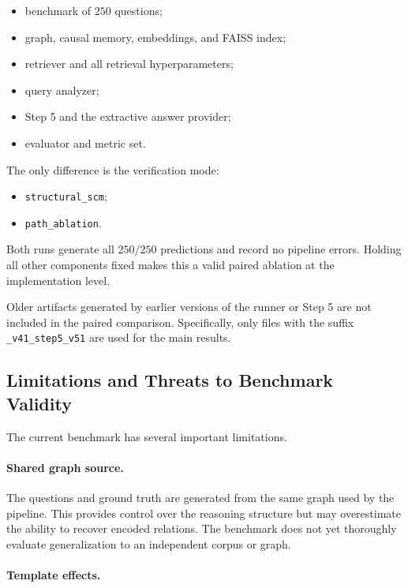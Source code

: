\begin{itemize}
    \item benchmark of \(250\) questions;
    \item graph, causal memory, embeddings, and FAISS index;
    \item retriever and all retrieval hyperparameters;
    \item query analyzer;
    \item Step 5 and the extractive answer provider;
    \item evaluator and metric set.
\end{itemize}

The only difference is the verification mode:

\begin{itemize}
    \item \texttt{structural\_scm};
    \item \texttt{path\_ablation}.
\end{itemize}

Both runs generate all \(250/250\) predictions and record no pipeline errors.
Holding all other components fixed makes this a valid paired ablation at the
implementation level.

Older artifacts generated by earlier versions of the runner or Step 5 are not
included in the paired comparison. Specifically, only files with the suffix
\texttt{\_v41\_step5\_v51} are used for the main results.

\subsection{Limitations and Threats to Benchmark Validity}

The current benchmark has several important limitations.

\paragraph{Shared graph source.}

The questions and ground truth are generated from the same graph used by the
pipeline. This provides control over the reasoning structure but may
overestimate the ability to recover encoded relations. The benchmark does not
yet thoroughly evaluate generalization to an independent corpus or graph.

\paragraph{Template effects.}

